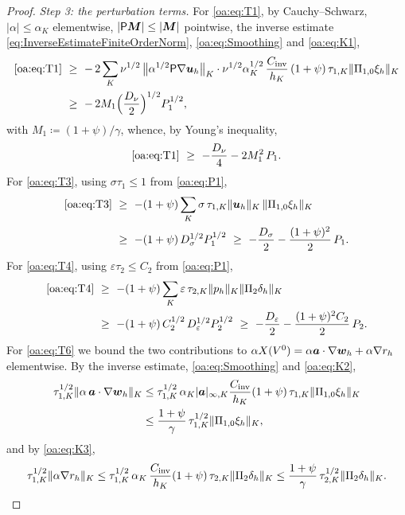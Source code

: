 \begin{proof}
\medskip\noindent\emph{Step 3: the perturbation terms.}
For \cref{oa:eq:T1}, by Cauchy--Schwarz, $|\alpha| \le \alpha_K$ elementwise,
$|\mathsf{P} \boldsymbol{M}| \le |\boldsymbol{M}|$ pointwise, the inverse estimate
\cref{eq:InverseEstimateFiniteOrderNorm}, \cref{oa:eq:Smoothing} and \cref{oa:eq:K1},
\begin{align*}
  \text{\cref{oa:eq:T1}}
  &\ \ge\ -\,2\sum_K \nu^{1/2}\,\bigl\lVert\alpha^{1/2}\ViscProj\nabla\bu_h\bigr\rVert_K
  \cdot \nu^{1/2}\alpha_K^{1/2}\,\frac{C_{\mathrm{inv}}}{h_K}\,(1+\psi)\,\tau_{1,K}
  \norm{\Ponez\xi_h}_K\\
  &\ \ge\ -\,2 M_1 \Bigl(\frac{D_\nu}{2}\Bigr)^{1/2} P_1^{1/2},
\end{align*}
with $M_1 \coloneqq (1+\psi)/\gamma$, whence, by Young's inequality,
\[
  \text{\cref{oa:eq:T1}} \ \ge\ -\frac{D_\nu}{4} - 2M_1^2\, P_1 .
\]
For \cref{oa:eq:T3}, using $\sigma\tau_1 \le 1$ from \cref{oa:eq:P1},
\begin{align*}
  \text{\cref{oa:eq:T3}}
  &\ \ge\ -(1+\psi)\sum_K \sigma\,\tau_{1,K}\normK{\bu_h}\,\normK{\Ponez\xi_h}\\
  &\ \ge\ -(1+\psi)\, D_\sigma^{1/2} P_1^{1/2}
  \ \ge\ -\frac{D_\sigma}{2} - \frac{(1+\psi)^2}{2}\,P_1 .
\end{align*}
For \cref{oa:eq:T4}, using $\varepsilon\tau_2 \le C_2$ from \cref{oa:eq:P1},
\begin{align*}
  \text{\cref{oa:eq:T4}}
  &\ \ge\ -(1+\psi)\sum_K \varepsilon\,\tau_{2,K}\normK{p_h}\normK{\Ptwo\delta_h}\\
  &\ \ge\ -(1+\psi)\,C_2^{1/2}\, D_\varepsilon^{1/2} P_2^{1/2}
  \ \ge\ -\frac{D_\varepsilon}{2} - \frac{(1+\psi)^2 C_2}{2}\,P_2 .
\end{align*}
For \cref{oa:eq:T6} we bound the two contributions to
$\alpha X(V^0) = \alpha\boldsymbol{a}\cdot\nabla\boldsymbol{w}_h + \alpha\nabla r_h$ elementwise. By the
inverse estimate, \cref{oa:eq:Smoothing} and \cref{oa:eq:K2},
\[
\begin{aligned}
  \tau_{1,K}^{1/2}\lVert \alpha\,\boldsymbol{a}\cdot\nabla\boldsymbol{w}_h \rVert_{K}
  &\le \tau_{1,K}^{1/2}\,\alpha_K |\boldsymbol{a}|_{\infty,K}\frac{C_{\mathrm{inv}}}{h_K}
  (1+\psi)\,\tau_{1,K}\lVert \Pi_{1,0}\xi_h \rVert_{K} \\
  &\le \frac{1+\psi}{\gamma}\,\tau_{1,K}^{1/2}\lVert \Pi_{1,0}\xi_h \rVert_{K},
\end{aligned}
\]
and by \cref{oa:eq:K3},
\[
  \tau_{1,K}^{1/2}\lVert \alpha\nabla r_h \rVert_{K}
  \le \tau_{1,K}^{1/2}\,\alpha_K\,\frac{C_{\mathrm{inv}}}{h_K}(1+\psi)\,
  \tau_{2,K}\lVert \Pi_{2}\delta_h \rVert_{K}
  \le \frac{1+\psi}{\gamma}\,\tau_{2,K}^{1/2}\lVert \Pi_{2}\delta_h \rVert_{K}.
\]
\end{proof}
